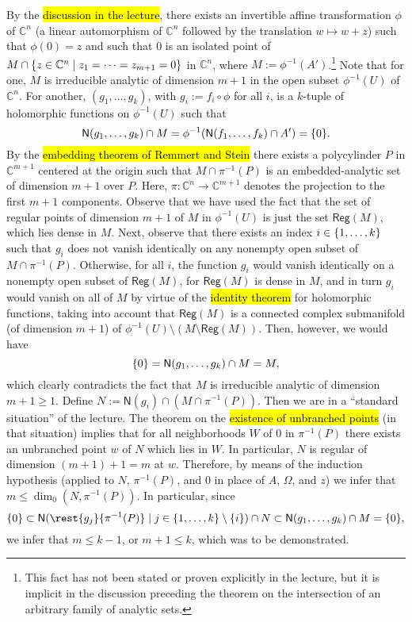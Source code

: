 \documentclass[a4paper]{amsart}
\newcommand{\C}{\mathbb{C}}
\newcommand{\Zero}[1]{\mathsf{N}(#1)}
\newcommand{\Reg}[1]{\mathsf{Reg}(#1)}
\theoremstyle{remark}
\numberwithin{equation}{question}
\DeclarePairedDelimiter\set{\{}{\}}
\begin{document}
\begin{solution}
\begin{solenum}
By the \hl{discussion in the lecture}, there exists an invertible affine transformation $\phi$ of $\C^n$ (a linear automorphism of $\C^n$ followed by the translation $w \mapsto w+z$) such that $\phi(0) = z$ and such that $0$ is an isolated point of $M \cap \set{z \in \C^n \mid z_1 = \dots = z_{m+1} = 0}$ in $\C^n$, where $M := \phi^{-1}(A')$.\footnote{This fact has not been stated or proven explicitly in the lecture, but it is implicit in the discussion preceding the theorem on the intersection of an arbitrary family of analytic sets.} Note that for one, $M$ is irreducible analytic of dimension $m+1$ in the open subset $\phi^{-1}(U)$ of $\C^n$. For another, $(g_1, \dots, g_k)$, with $g_i := f_i \circ \phi$ for all $i$, is a $k$-tuple of holomorphic functions on $\phi^{-1}(U)$ such that
\[
\Zero{g_1,\dots,g_k} \cap M = \phi^{-1}(\Zero{f_1,\dots,f_k} \cap A') = \set 0.
\]
By the \hl{embedding theorem of Remmert and Stein} there exists a polycylinder $P$ in $\C^{m+1}$ centered at the origin such that $M \cap \pi^{-1}(P)$ is an embedded-analytic set of dimension $m+1$ over $P$. Here, $\pi \colon \C^n \to \C^{m+1}$ denotes the projection to the first $m+1$ components. Observe that we have used the fact that the set of regular points of dimension $m+1$ of $M$ in $\phi^{-1}(U)$ is just the set $\Reg M$, which lies dense in $M$. Next, observe that there exists an index $i \in \set{1,\dots,k}$ such that $g_i$ does not vanish identically on any nonempty open subset of $M \cap \pi^{-1}(P)$. Otherwise, for all $i$, the function $g_i$ would vanish identically on a nonempty open subset of $\Reg M$, for $\Reg M$ is dense in $M$, and in turn $g_i$ would vanish on all of $M$ by virtue of the \hl{identity theorem} for holomorphic functions, taking into account that $\Reg M$ is a connected complex submanifold (of dimension $m+1$) of $\phi^{-1}(U) \setminus (M \setminus \Reg M)$. Then, however, we would have
\[
\set 0 = \Zero{g_1,\dots,g_k} \cap M = M,
\]
which clearly contradicts the fact that $M$ is irreducible analytic of dimension $m+1 \ge 1$. Define $N := \Zero{g_i} \cap (M \cap \pi^{-1}(P))$. Then we are in a “standard situation” of the lecture. The theorem on the \hl{existence of unbranched points} (in that situation) implies that for all neighborhoods $W$ of $0$ in $\pi^{-1}(P)$ there exists an unbranched point $w$ of $N$ which lies in $W$. In particular, $N$ is regular of dimension $(m+1)+1 = m$ at $w$. Therefore, by means of the induction hypothesis (applied to $N$, $\pi^{-1}(P)$, and $0$ in place of $A$, $\Omega$, and $z$) we infer that $m \le \dim_0(N,\pi^{-1}(P))$. In particular, since
\[
\set 0 \subset \Zero{\rest{g_j}{\pi^{-1}(P)} \mid j \in \set{1,\dots,k} \setminus \set i} \cap N \subset \Zero{g_1,\dots,g_k} \cap M = \set 0,
\]
we infer that $m \le k-1$, or $m+1 \le k$, which was to be demonstrated.


\end{solenum}
\end{solution}
\end{document}
